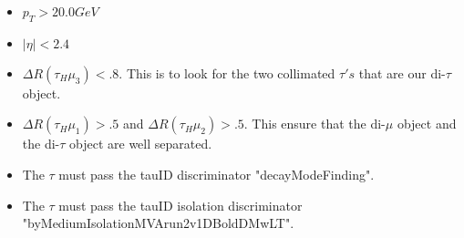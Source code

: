 \begin{itemize}  
  \item $p_{T} > 20.0 GeV$
  \item $|\eta| < 2.4$
  \item $\Delta R(\tau_{H}\mu_{3}) < .8$. This is to look for the two collimated $\tau's$ that are our di-$\tau$ object.
  \item $\Delta R(\tau_{H}\mu_{1}) > .5$ and $\Delta R(\tau_{H}\mu_{2}) > .5$. This ensure that the di-$\mu$ object and the di-$\tau$ object are well separated.
  \item The $\tau$ must pass the tauID discriminator "decayModeFinding".
  \item The $\tau$ must pass the tauID isolation discriminator "byMediumIsolationMVArun2v1DBoldDMwLT". 
\end{itemize}

